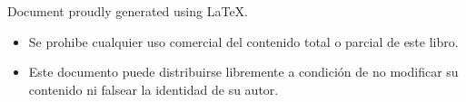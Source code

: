 
\begin{center}
    \thispagestyle{plain}
    \vspace*{1cm}Document proudly generated using \LaTeX{}.\newline\newline
    
    \end{center}
    \begin{itemize}
    \item Se prohibe cualquier uso comercial del contenido total o parcial de este libro.
    \item Este documento puede distribuirse libremente a condición de no modificar su contenido ni falsear la identidad de su autor.
    \end{itemize}
    
